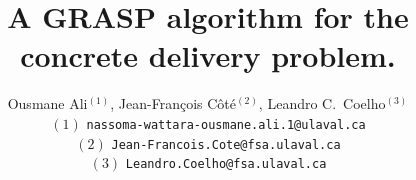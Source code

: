 \documentclass{article}
\title{A GRASP algorithm for the concrete delivery problem. }
\author{Ousmane Ali$^{(1)}$, Jean-Fran\c cois C\^ot\'e$^{(2)}$, Leandro C.~Coelho$^{(3)}$\\
 $(1)$ {\tt nassoma-wattara-ousmane.ali.1@ulaval.ca}\\
 $(2)$ {\tt Jean-Francois.Cote@fsa.ulaval.ca}\\
 $(3)$ {\tt Leandro.Coelho@fsa.ulaval.ca}\\
}
\begin{document}
\maketitle
\begin{abstract}
\end{abstract}
\end{document}
